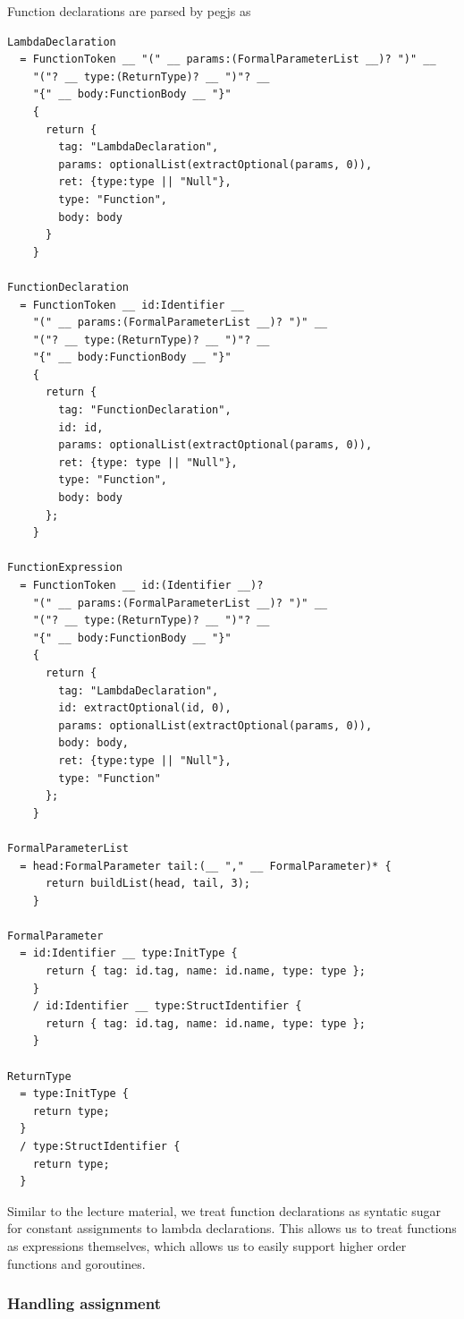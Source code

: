 \documentclass{report}
\begin{document}
Function declarations are parsed by pegjs as 

\begin{verbatim}
LambdaDeclaration
  = FunctionToken __ "(" __ params:(FormalParameterList __)? ")" __
    "("? __ type:(ReturnType)? __ ")"? __
    "{" __ body:FunctionBody __ "}"
    {
      return {
        tag: "LambdaDeclaration",
        params: optionalList(extractOptional(params, 0)),
        ret: {type:type || "Null"},
        type: "Function",
        body: body
      }
    }

FunctionDeclaration
  = FunctionToken __ id:Identifier __
    "(" __ params:(FormalParameterList __)? ")" __
    "("? __ type:(ReturnType)? __ ")"? __
    "{" __ body:FunctionBody __ "}"
    {
      return {
        tag: "FunctionDeclaration",
        id: id,
        params: optionalList(extractOptional(params, 0)),
        ret: {type: type || "Null"},
        type: "Function",
        body: body
      };
    }

FunctionExpression
  = FunctionToken __ id:(Identifier __)?
    "(" __ params:(FormalParameterList __)? ")" __
    "("? __ type:(ReturnType)? __ ")"? __
    "{" __ body:FunctionBody __ "}"
    {
      return {
        tag: "LambdaDeclaration",
        id: extractOptional(id, 0),
        params: optionalList(extractOptional(params, 0)),
        body: body,
        ret: {type:type || "Null"},
        type: "Function"
      };
    }

FormalParameterList
  = head:FormalParameter tail:(__ "," __ FormalParameter)* {
      return buildList(head, tail, 3);
    }

FormalParameter
  = id:Identifier __ type:InitType {
      return { tag: id.tag, name: id.name, type: type };
    }
    / id:Identifier __ type:StructIdentifier {
      return { tag: id.tag, name: id.name, type: type };
    }

ReturnType
  = type:InitType {
    return type;
  }
  / type:StructIdentifier {
    return type;
  }
\end{verbatim}

Similar to the lecture material, we treat function declarations as syntatic sugar for constant assignments to lambda declarations. This allows us to treat functions as expressions themselves, which allows us to easily support higher order functions and goroutines.

\subsubsection{Handling assignment}
\end{document}
